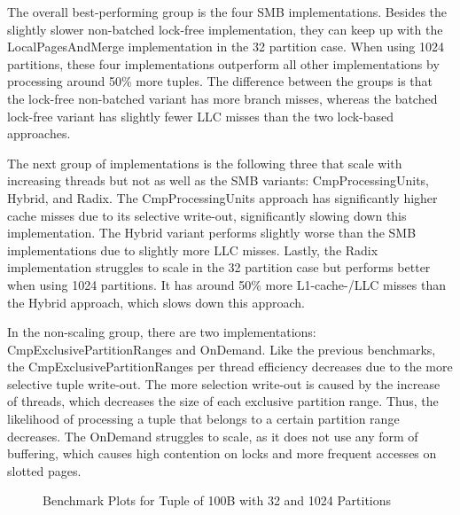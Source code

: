 The overall best-performing group is the four \ac{SMB} implementations.
Besides the slightly slower non-batched lock-free implementation, they can keep up with the LocalPagesAndMerge implementation in the 32 partition case.
When using 1024 partitions, these four implementations outperform all other implementations by processing around 50\% more tuples.
The difference between the groups is that the lock-free non-batched variant has more branch misses, whereas the batched lock-free variant has slightly fewer \ac{LLC} misses than the two lock-based approaches.

The next group of implementations is the following three that scale with increasing threads but not as well as the \ac{SMB} variants: CmpProcessingUnits, Hybrid, and Radix.
The CmpProcessingUnits approach has significantly higher cache misses due to its selective write-out, significantly slowing down this implementation.
The Hybrid variant performs slightly worse than the \ac{SMB} implementations due to slightly more \ac{LLC} misses.
Lastly, the Radix implementation struggles to scale in the 32 partition case but performs better when using 1024 partitions.
It has around 50\% more L1-cache-/\ac{LLC} misses than the Hybrid approach, which slows down this approach.

In the non-scaling group, there are two implementations: CmpExclusivePartitionRanges and OnDemand.
Like the previous benchmarks, the CmpExclusivePartitionRanges per thread efficiency decreases due to the more selective tuple write-out.
The more selection write-out is caused by the increase of threads, which decreases the size of each exclusive partition range.
Thus, the likelihood of processing a tuple that belongs to a certain partition range decreases.
The OnDemand struggles to scale, as it does not use any form of buffering, which causes high contention on locks and more frequent accesses on slotted pages.

\begin{figure}[h]
  \centering
  \begin{subfigure}{.49\textwidth}
    \centering
    \resizebox{\linewidth}{!}{}
  \end{subfigure}
  \begin{subfigure}{.49\textwidth}
    \centering
    \resizebox{\linewidth}{!}{}
  \end{subfigure}
  \begin{subfigure}{\textwidth}
    \centering
    \resizebox{\linewidth}{!}{}
  \end{subfigure}
  \caption[Shuffle Benchmark Plots for Tuple of 100B with 32 and 1024 Partitions]{Benchmark Plots for Tuple of 100B with 32 and 1024 Partitions}
  \label{plot-shuffle-100B-32-1024}
\end{figure}


